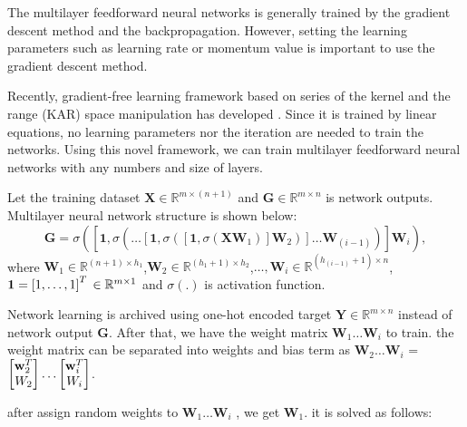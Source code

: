 \documentclass[runningheads]{llncs}
\begin{document}
The multilayer feedforward neural networks is generally trained by the gradient descent method and the backpropagation.
However, setting the learning parameters such as learning rate or momentum value is important to use the gradient descent method. 

Recently, gradient-free learning framework based on series of the kernel and the range (KAR) space manipulation has developed \cite{toh2018learning,toh2018gradient}.
Since it is trained by linear equations, no learning parameters nor the iteration are needed to train the networks.
Using this novel framework, we can train multilayer feedforward neural networks with any numbers and size of layers.

Let the training dataset $\mathbf{X}\in{\mathbb{R}}^{m \times (n+1)}$ and $\mathbf{G}\in{\mathbb{R}}^{m \times n}$ is network outputs.
Multilayer neural network structure is shown below:
\begin{equation}
    \mathbf{G} = \sigma\left(\left[\mathbf{1},\sigma\left(\dots\left[\mathbf{1},\sigma\left(\left[\mathbf{1},\sigma\left(\mathbf{X}\mathbf{W}_{1}\right)\right]\mathbf{W}_{2}\right)\right]\dots\mathbf{W}_{(i-1)}\right)\right]\mathbf{W}_{i}\right),
\end{equation}
where $\mathbf{W}_{1}\in{\mathbb{R}}^{(n+1) \times h_{1}}$,$\mathbf{W}_{2}\in{\mathbb{R}}^{(h_{1}+1) \times h_{2}}$,$\dots,\mathbf{W}_{i}\in{\mathbb{R}}^{(h_{(i-1)}+1) \times n}$,$\mathbf{1}=\left[1,\dots,1\right]^{T}\\
\in{\mathbb{R}}^{m \times 1}$ and $\sigma(.)$ is activation function.

Network learning is archived using one-hot encoded target $\mathbf{Y}\in{\mathbb{R}}^{m \times n}$ instead of network output $\mathbf{G}$.
After that, we have the weight matrix $\mathbf{W}_{1}\dots\mathbf{W}_{i}$ to train. the weight matrix can be separated into weights and bias term as
$\mathbf{W}_{2}\dots\mathbf{W}_{i}$ = 
$\begin{bmatrix}
\mathbf{w}_{2}^{T}\\\mathnormal{W}_{2}
\end{bmatrix}
\dots
\begin{bmatrix}
\mathbf{w}_{i}^{T}\\\mathnormal{W}_{i}
\end{bmatrix}$.

after assign random weights to $\mathbf{W}_{1}\dots\mathbf{W}_{i}$ , we get $\mathbf{W}_{1}$. it is solved as follows:
\end{document}
